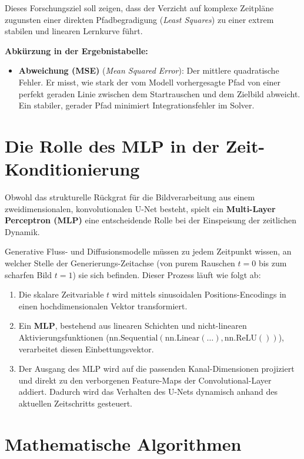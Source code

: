 \documentclass[11pt,a4paper]{article}
\begin{document}
Dieses Forschungsziel soll zeigen, dass der Verzicht auf komplexe Zeitpläne zugunsten einer direkten Pfadbegradigung (\textit{Least Squares}) zu einer extrem stabilen und linearen Lernkurve führt.

\textbf{Abkürzung in der Ergebnistabelle:}
\begin{itemize}
    \item \textbf{Abweichung (MSE)} (\textit{Mean Squared Error}): Der mittlere quadratische Fehler. Er misst, wie stark der vom Modell vorhergesagte Pfad von einer perfekt geraden Linie zwischen dem Startrauschen und dem Zielbild abweicht. Ein stabiler, gerader Pfad minimiert Integrationsfehler im Solver.
\end{itemize}

\section{Die Rolle des MLP in der Zeit-Konditionierung}
Obwohl das strukturelle Rückgrat für die Bildverarbeitung aus einem zweidimensionalen, konvolutionalen U-Net besteht, spielt ein \textbf{Multi-Layer Perceptron (MLP)} eine entscheidende Rolle bei der Einspeisung der zeitlichen Dynamik.

Generative Fluss- und Diffusionsmodelle müssen zu jedem Zeitpunkt wissen, an welcher Stelle der Generierungs-Zeitachse (von purem Rauschen $t=0$ bis zum scharfen Bild $t=1$) sie sich befinden. Dieser Prozess läuft wie folgt ab:
\begin{enumerate}
    \item Die skalare Zeitvariable $t$ wird mittels sinusoidalen Positions-Encodings in einen hochdimensionalen Vektor transformiert.
    \item Ein \textbf{MLP}, bestehend aus linearen Schichten und nicht-linearen Aktivierungsfunktionen ($\text{nn.Sequential}(\text{nn.Linear}(\dots), \text{nn.ReLU}())$), verarbeitet diesen Einbettungsvektor.
    \item Der Ausgang des MLP wird auf die passenden Kanal-Dimensionen projiziert und direkt zu den verborgenen Feature-Maps der Convolutional-Layer addiert. Dadurch wird das Verhalten des U-Nets dynamisch anhand des aktuellen Zeitschritts gesteuert.
\end{enumerate}

\section{Mathematische Algorithmen}
\end{document}
